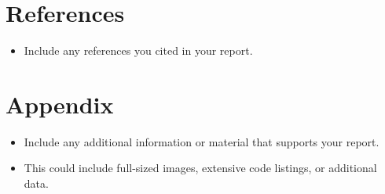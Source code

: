 \documentclass{article}
\begin{document}
\section{References}
\begin{itemize}
    \item Include any references you cited in your report.
\end{itemize}

\section{Appendix}
\begin{itemize}
    \item Include any additional information or material that supports your report.
    \item This could include full-sized images, extensive code listings, or additional data.
\end{itemize}

\newpage

\thispagestyle{empty}

\printbibliography
\end{document}
